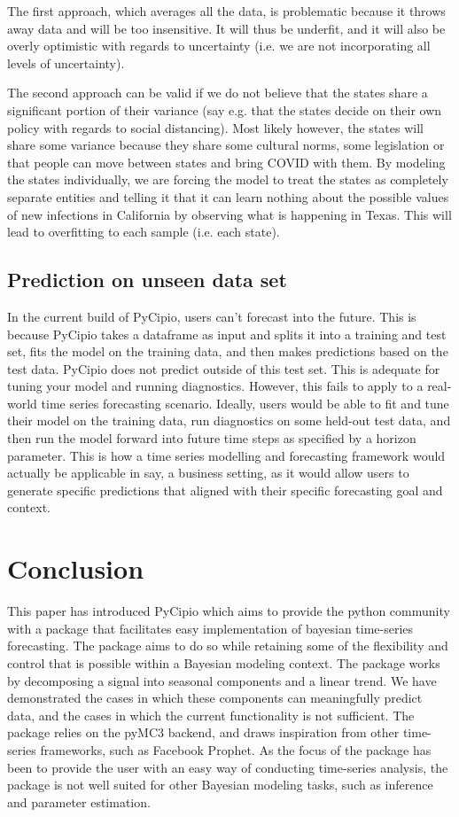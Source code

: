 \documentclass{article}
\begin{document}
The first approach, which averages all the data, is problematic because it throws away data and will be too insensitive. It will thus be underfit, and it will also be overly optimistic with regards to uncertainty (i.e. we are not incorporating all levels of uncertainty).

The second approach can be valid if we do not believe that the states share a significant portion of their variance (say e.g. that the states decide on their own policy with regards to social distancing). Most likely however, the states will share some variance because they share some cultural norms, some legislation or that people can move between states and bring COVID with them. By modeling the states individually, we are forcing the model to treat the states as completely separate entities and telling it that it can learn nothing about the possible values of new infections in California by observing what is happening in Texas. This will lead to overfitting to each sample (i.e. each state).

\subsection{Prediction on unseen data set}

In the current build of PyCipio, users can't forecast into the future. This is because PyCipio takes a dataframe as input and splits it into a training and test set, fits the model on the training data, and then makes predictions based on the test data. PyCipio does not predict outside of this test set. This is adequate for tuning your model and running diagnostics. However, this fails to apply to a real-world time series forecasting scenario. Ideally, users would be able to fit and tune their model on the training data, run diagnostics on some held-out test data, and then run the model forward into future time steps as specified by a horizon parameter. This is how a time series modelling and forecasting framework would actually be applicable in say, a business setting, as it would allow users to generate specific predictions that aligned with their specific forecasting goal and context.

\section{Conclusion}

This paper has introduced PyCipio which aims to provide the python community with a package that facilitates easy implementation of bayesian time-series forecasting. The package aims to do so while retaining some of the flexibility and control that is possible within a Bayesian modeling context. The package works by decomposing a signal into seasonal components and a linear trend. We have demonstrated the cases in which these components can meaningfully predict data, and the cases in which the current functionality is not sufficient. The package relies on the pyMC3 backend, and draws inspiration from other time-series frameworks, such as Facebook Prophet. As the focus of the package has been to provide the user with an easy way of conducting time-series analysis, the package is not well suited for other Bayesian modeling tasks, such as inference and parameter estimation. 




\end{document}
